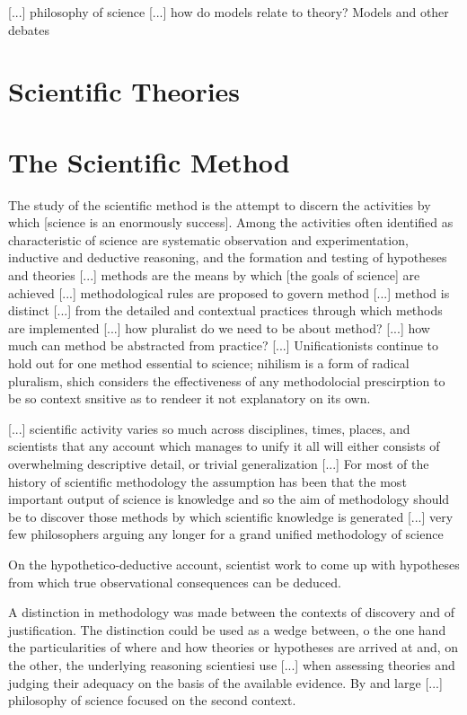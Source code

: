 {\color{red} [...] philosophy of science [...] how do models relate to theory? Models and other debates} 

\section{Scientific Theories}



\section{The Scientific Method}

{\color{red} The study of the scientific method is the attempt to discern the activities by which [science is an enormously success]. Among the activities often identified as characteristic of science are systematic observation and experimentation, inductive and deductive reasoning, and the formation and testing of hypotheses and theories [...] methods are the means by which [the goals of science] are achieved [...] methodological rules are proposed to govern method [...] method is distinct [...] from the detailed and contextual practices through which methods are implemented [...] how pluralist do we need to be about method? [...] how much can method be abstracted from practice? [...] Unificationists continue to hold out for one method essential to science; nihilism is a form of radical pluralism, shich considers the effectiveness of any methodolocial prescirption to be so context snsitive as to rendeer it not explanatory on its own.}

{\color{red} [...] scientific activity varies so much across disciplines, times, places, and scientists that any account which manages to unify it all will either consists of overwhelming descriptive detail, or trivial generalization [...] For most of the history of scientific methodology the assumption has been that the most important output of science is knowledge and so the aim of methodology should be to discover those methods by which scientific knowledge is generated [...] very few philosophers arguing any longer for a grand unified methodology of science}

{\color{red} On the hypothetico-deductive account, scientist work to come up with hypotheses from which true observational consequences can be deduced.}

{\color{red} A distinction in methodology was made between the contexts of discovery and of justification. The distinction could be used as a wedge between, o the one hand the particularities of where and how theories or hypotheses are arrived at and, on the other, the underlying reasoning scientiesi use [...] when assessing theories and judging their adequacy on the basis of the available evidence. By and large [...] philosophy of science focused on the second context.}

